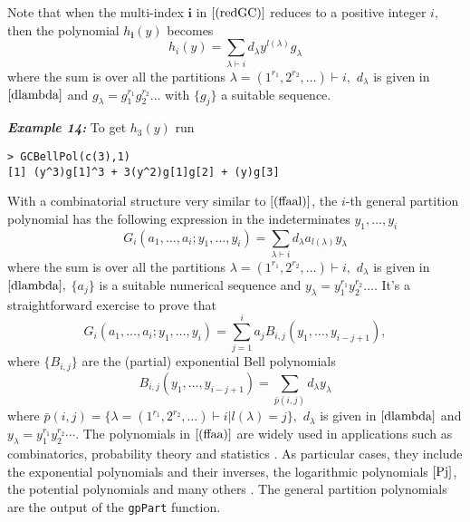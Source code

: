 Note that when the multi-index \(\boldsymbol{i}\) in \(\eqref{(redGC)}\)
reduces to a positive integer \(i,\) then the polynomial
\(h_{\boldsymbol{i}}(y)\) becomes \begin{equation}
h_i(y) = \sum_{\lambda \vdash i}  d_{\lambda}  y^{l(\lambda)} g_{\lambda} 
\label{(ffaal)}
\end{equation} where the sum is over all the partitions
\(\lambda=(1^{r_1}, 2^{r_2}, \ldots) \vdash i,\) \(d_{\lambda}\) is
given in \(\eqref{dlambda}\) and
\(g_{\lambda}= g_1^{r_1} g_2^{r_2} \ldots\) with \(\{g_j\}\) a suitable
sequence.

\hskip-0.5cm\textbf{\emph{Example 14:}} To get \(h_{3}(y)\) run

\begin{verbatim}
> GCBellPol(c(3),1)
[1] (y^3)g[1]^3 + 3(y^2)g[1]g[2] + (y)g[3]
\end{verbatim}

With a combinatorial structure very similar to \(\eqref{(ffaal)}\), the
\(i\)-th general partition polynomial has the following expression in
the indeterminates \(y_1, \ldots, y_i\) \begin{equation}
G_i( a_1, \ldots, a_i; y_1, \ldots, y_i) = \sum_{\lambda \vdash i}  d_{\lambda}  a_{l(\lambda)} y_{\lambda} 
\label{(ffaa)}
\end{equation} where the sum is over all the partitions
\(\lambda=(1^{r_1}, 2^{r_2}, \ldots) \vdash i,\) \(d_{\lambda}\) is
given in \(\eqref{dlambda},\) \(\{a_j\}\) is a suitable numerical
sequence and \(y_{\lambda} = y_1^{r_1} y_2^{r_2} \ldots.\) It's a
straightforward exercise to prove that \begin{equation}
G_i( a_1, \ldots, a_i; y_1, \ldots, y_i) = \sum_{j=1}^i a_j B_{i,j}(y_1, \ldots, y_{i-j+1}), 
\label{gpp}
\end{equation} where \(\{B_{i,j}\}\) are the (partial) exponential Bell
polynomials \begin{equation}
B_{i,j}(y_1,  \ldots, y_{i-j+1}) =  \sum_{\bar{p}(i,j)} d_{\lambda} y_{\lambda} 
\label{(parexpBell)}
\end{equation} where
\(\bar{p}(i,j) = \{\lambda=(1^{r_1}, 2^{r_2}, \ldots) \vdash i | l(\lambda)=j\},\)
\(d_{\lambda}\) is given in \(\eqref{dlambda}\) and
\(y_{\lambda} =y_1^{r_1} y_2^{r_2} \cdots.\) The polynomials in
\(\eqref{(ffaa)}\) are widely used in applications such as
combinatorics, probability theory and statistics \citep{MR1937238}. As
particular cases, they include the exponential polynomials and their
inverses, the logarithmic polynomials \(\eqref{Pj}\), the potential
polynomials and many others \citep{MR741185}. The general partition
polynomials are the output of the \texttt{gpPart} function.

